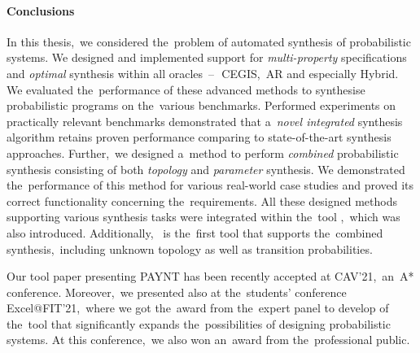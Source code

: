\paragraph{Conclusions}
In this thesis,~we considered the~problem of automated synthesis of probabilistic systems.
We designed and implemented support for \emph{multi-property} specifications and \emph{optimal} synthesis within all oracles \,--\,~CEGIS,~AR and especially Hybrid.
We evaluated the~performance of these advanced methods to synthesise probabilistic programs on the~various benchmarks.
Performed experiments on practically relevant benchmarks demonstrated that a~\textit{novel integrated} synthesis algorithm retains proven performance comparing to state-of-the-art synthesis approaches.
Further,~we designed a~method to perform \emph{combined} probabilistic synthesis consisting of both \emph{topology} and \emph{parameter} synthesis.
We demonstrated the~performance of this method for various real-world case studies and proved its correct functionality concerning the~requirements.
All these designed methods supporting various synthesis tasks were integrated within the~tool \toolname{},~which was also introduced.
Additionally,~\toolname{} is the~first tool that supports the~combined synthesis,~including unknown topology as well as transition probabilities.

Our tool paper presenting PAYNT has been recently accepted at CAV'21,~an~A* conference.
Moreover,~we presented \toolname{} also at the~students' conference Excel@FIT'21,~where we got the~award from the~expert panel to develop of the~tool that significantly expands the~possibilities of designing probabilistic systems.
At this conference,~we also won an~award from the~professional public.
